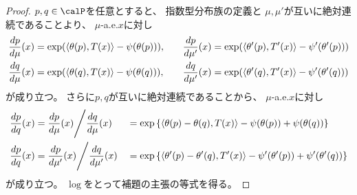 \documentclass[report]{jlreq}
\begin{document}
\begin{proof}
    $p, q \in \calP$を任意とすると、
    指数型分布族の定義と
    $\mu, \mu'$が互いに絶対連続であることより、
    $\mu$-a.e.$x$に対し
    \begin{equation}
        \begin{alignedat}{2}
            \dd[p]{\mu}(x)
                &=
                    \exp(\myangle{\theta(p)}{T(x)} - \psi(\theta(p))),
                    \qquad
            &\dd[p]{\mu'}(x)
                &=
                    \exp(\myangle{\theta'(p)}{T'(x)} - \psi'(\theta'(p)))
                \\
            \dd[q]{\mu}(x)
                &=
                    \exp(\myangle{\theta(q)}{T(x)} - \psi(\theta(q))),
                    \qquad
            &\dd[q]{\mu'}(x)
                &=
                    \exp(\myangle{\theta'(q)}{T'(x)} - \psi'(\theta'(q)))
        \end{alignedat}
    \end{equation}
    が成り立つ。
    さらに$p, q$が互いに絶対連続であることから、
    $\mu$-a.e.$x$に対し
    \begin{alignat}{2}
        \dd[p]{q}(x)
            &=
                \dd[p]{\mu}(x) \Bigg/ \dd[q]{\mu}(x)
            &&=
                \exp\mybrace{
                    \myangle{\theta(p) - \theta(q)}{T(x)}
                    - \psi(\theta(p)) + \psi(\theta(q))
                }
                \\
        \dd[p]{q}(x)
            &=
                \dd[p]{\mu'}(x) \Bigg/ \dd[q]{\mu'}(x)
            &&=
                \exp\mybrace{
                    \myangle{\theta'(p) - \theta'(q)}{T'(x)}
                    - \psi'(\theta'(p)) + \psi'(\theta'(q))
                }
    \end{alignat}
    が成り立つ。
    $\log$をとって補題の主張の等式を得る。
\end{proof}
\end{document}
